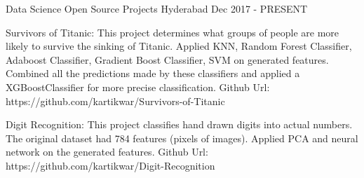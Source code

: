 \begin{cventries}


  \cventry
    {Data Science} %
    {Open Source Projects} %
    {Hyderabad} %
    {Dec 2017 - PRESENT} %
    {
      \begin{cvitems} %
        \item {Survivors of Titanic: This project determines what groups of people are more likely to survive the sinking of Titanic. Applied KNN, Random Forest Classifier, Adaboost Classifier, Gradient Boost Classifier, SVM on generated features. Combined all the predictions made by these classifiers and applied a XGBoostClassifier for more precise classification. Github Url: https://github.com/kartikwar/Survivors-of-Titanic} 
        \item {Digit Recognition:  This project classifies hand drawn digits into actual numbers. The original dataset had 784 features (pixels of images). Applied PCA and neural network on the generated features. Github Url: https://github.com/kartikwar/Digit-Recognition}      
	\end{cvitems}
    }
\end{cventries}
